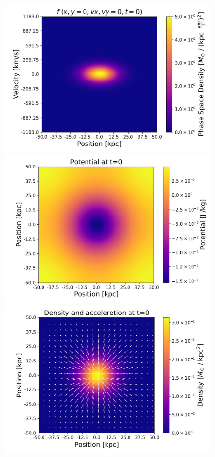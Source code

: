 {\begin{figure}[h!]
    \centering
    \includegraphics[scale=0.42]{imag/2dInitPhase.png}
    \includegraphics[scale=0.42]{imag/2dInitPot.png}
    \includegraphics[scale=0.60]{imag/2dInitAcceDens.png}

\end{figure}}
